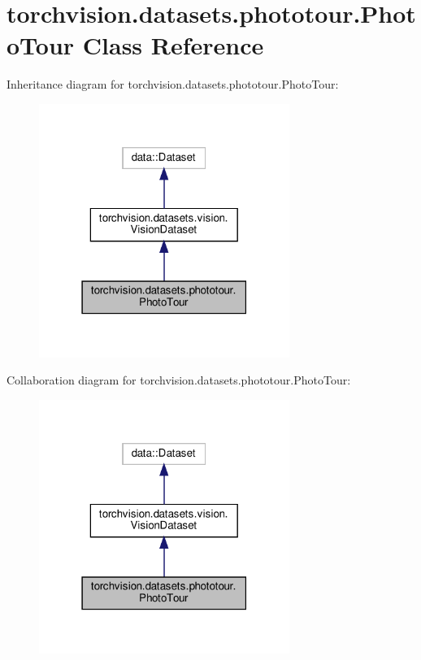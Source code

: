 \hypertarget{classtorchvision_1_1datasets_1_1phototour_1_1PhotoTour}{}\section{torchvision.\+datasets.\+phototour.\+Photo\+Tour Class Reference}
\label{classtorchvision_1_1datasets_1_1phototour_1_1PhotoTour}


Inheritance diagram for torchvision.\+datasets.\+phototour.\+Photo\+Tour\+:
\nopagebreak
\begin{figure}[H]
\begin{center}
\leavevmode
\includegraphics[width=231pt]{classtorchvision_1_1datasets_1_1phototour_1_1PhotoTour__inherit__graph}
\end{center}
\end{figure}


Collaboration diagram for torchvision.\+datasets.\+phototour.\+Photo\+Tour\+:
\nopagebreak
\begin{figure}[H]
\begin{center}
\leavevmode
\includegraphics[width=231pt]{classtorchvision_1_1datasets_1_1phototour_1_1PhotoTour__coll__graph}
\end{center}
\end{figure}
